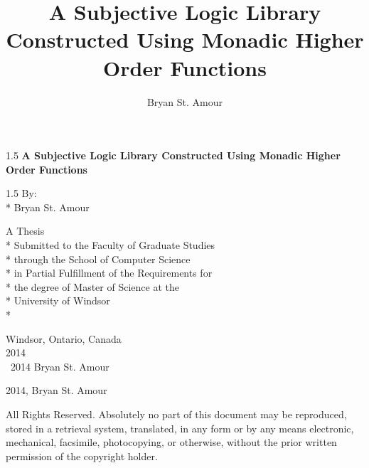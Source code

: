 \documentclass[oneside, 12pt]{book}
\title{A Subjective Logic Library Constructed Using Monadic Higher Order Functions}
\author{Bryan St. Amour}
\newcommand{\uwinonehalfspacelen}{1.5}
\newenvironment{uwinonehalfspaceenv}%
{\begin{spacing}{\uwinonehalfspacelen}}%
  {\end{spacing}}
\begin{document}


\clearpage

\thispagestyle{empty}
\begin{center}
  \vspace*{1in}

  \begin{uwinonehalfspaceenv}
    \Large\textbf{A Subjective Logic Library Constructed Using Monadic Higher Order Functions}
  \end{uwinonehalfspaceenv}

  \vspace{\fill} %
  \begin{uwinonehalfspaceenv}
    By:\\*
    Bryan St. Amour
  \end{uwinonehalfspaceenv}
  \vspace{\fill}

  \normalsize
  A Thesis \\*
  Submitted to the Faculty of Graduate Studies \\*
  through the School of Computer Science \\*
  in Partial Fulfillment of the Requirements for \\*
  the degree of Master of Science at the \\*
  University of Windsor \\*

  \vspace{1in}
  Windsor, Ontario, Canada \\
  \vspace{0.5cm}
  2014 \\
  \vspace{0.5cm}
  \textcopyright \  2014 Bryan St. Amour
\end{center}


\clearpage
\thispagestyle{empty}

\vspace*{\fill}

\noindent \textcopyright{} 2014, Bryan St. Amour

\vspace{2ex}

\noindent All Rights Reserved. Absolutely no part of this document may
be reproduced, stored in a retrieval system, translated, in any form
or by any means electronic, mechanical, facsimile, photocopying, or
otherwise, without the prior written permission of the copyright
holder.
\end{document}
